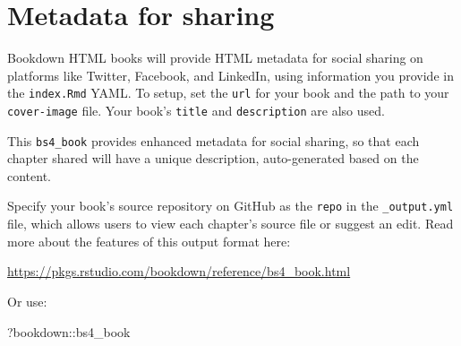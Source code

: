 \documentclass[
]{book}
\newenvironment{Shaded}{\begin{snugshade}}{\end{snugshade}}
\newcommand{\NormalTok}[1]{#1}
\newcommand{\SpecialCharTok}[1]{\textcolor[rgb]{0.00,0.00,0.00}{#1}}
\begin{document}
\hypertarget{metadata-for-sharing}{%
\section{Metadata for sharing}\label{metadata-for-sharing}}

Bookdown HTML books will provide HTML metadata for social sharing on platforms like Twitter, Facebook, and LinkedIn, using information you provide in the \texttt{index.Rmd} YAML. To setup, set the \texttt{url} for your book and the path to your \texttt{cover-image} file. Your book's \texttt{title} and \texttt{description} are also used.

This \texttt{bs4\_book} provides enhanced metadata for social sharing, so that each chapter shared will have a unique description, auto-generated based on the content.

Specify your book's source repository on GitHub as the \texttt{repo} in the \texttt{\_output.yml} file, which allows users to view each chapter's source file or suggest an edit. Read more about the features of this output format here:

\url{https://pkgs.rstudio.com/bookdown/reference/bs4_book.html}

Or use:

\begin{Shaded}
\begin{Highlighting}[]
\NormalTok{?bookdown}\SpecialCharTok{::}\NormalTok{bs4\_book}
\end{Highlighting}
\end{Shaded}


  
\end{document}

